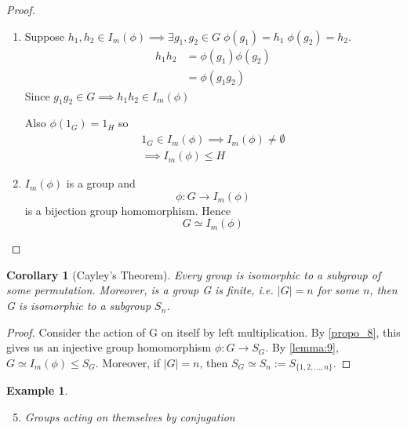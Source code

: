 \documentclass[11pt, oneside]{book}
\theoremstyle{break}
\newtheorem*{proof}{Proof}
\newtheorem{crly}{Corollary}[section]
\newtheorem{eg}{Example}[section]
\begin{document}
\begin{proof}
    \begin{enumerate}
        \item Suppose $h_1, h_2 \in I_m(\phi) \implies \exists g_1, g_2 \in G \; \phi(g_1) = h_1 \; \phi(g_2) = h_2$.
            \begin{align*}
                h_1 h_2 &= \phi(g_1) \phi(g_2) \\
                        &= \phi(g_1 g_2)
            \end{align*}
            Since $g_1 g_2 \in G \implies h_1 h_2 \in I_m(\phi)$

            Also $\phi(1_G) = 1_H$ so
            \begin{gather*}
                1_G \in I_m(\phi) \implies I_m(\phi) \neq \emptyset \\
                \implies I_m(\phi) \leq H
            \end{gather*}

        \item $I_m(\phi)$ is a group and
            \begin{equation}
                \phi: G \to I_m(\phi)
            \end{equation}
            is a bijection group homomorphism. Hence
            \begin{equation}
                G \simeq I_m(\phi)
            \end{equation}
    \end{enumerate}
\end{proof}

\begin{crly}[Cayley's Theorem]
    \label{thm:cayley}
    Every group is isomorphic to a subgroup of some permutation. Moreover, is a group G 
    is finite, i.e. $|G| = n$ for some $n$, then G is isomorphic to a subgroup $S_n$.
\end{crly}

\begin{proof}
    Consider the action of G on itself by left multiplication. By \autoref{propo_8}, this gives us an injective group homomorphism $\phi: G \to S_G$. 
    By \autoref{lemma:9}, $G \simeq I_m(\phi) \leq S_G$.
    Moreover, if $|G| = n$, then $S_G \simeq S_n := S_{\{1, 2, ..., n\}}$.
\end{proof}

\begin{eg}
    \begin{enumerate}
        \setcounter{enumi}{4}
        \item Groups acting on themselves by conjugation
    \end{enumerate}
\end{eg}
\end{document}
